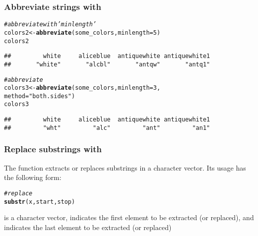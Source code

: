 \documentclass[12pt]{beamer}\usepackage[]{graphicx}\usepackage[]{color}
\makeatletter
\newcommand{\hlnum}[1]{\textcolor[rgb]{0.686,0.059,0.569}{#1}}%
\newcommand{\hlstr}[1]{\textcolor[rgb]{0.192,0.494,0.8}{#1}}%
\newcommand{\hlcom}[1]{\textcolor[rgb]{0.678,0.584,0.686}{\textit{#1}}}%
\newcommand{\hlstd}[1]{\textcolor[rgb]{0.345,0.345,0.345}{#1}}%
\newcommand{\hlkwb}[1]{\textcolor[rgb]{0.69,0.353,0.396}{#1}}%
\newcommand{\hlkwc}[1]{\textcolor[rgb]{0.333,0.667,0.333}{#1}}%
\newcommand{\hlkwd}[1]{\textcolor[rgb]{0.737,0.353,0.396}{\textbf{#1}}}%
\newenvironment{kframe}{%
 \def\at@end@of@kframe{}%
 \ifinner\ifhmode%
  \def\at@end@of@kframe{\end{minipage}}%
  \begin{minipage}{\columnwidth}%
 \fi\fi%
 \def\FrameCommand##1{\hskip\@totalleftmargin \hskip-\fboxsep
 \colorbox{shadecolor}{##1}\hskip-\fboxsep
     \hskip-\linewidth \hskip-\@totalleftmargin \hskip\columnwidth}%
 \MakeFramed {\advance\hsize-\width
   \@totalleftmargin\z@ \linewidth\hsize
   \@setminipage}}%
 {\par\unskip\endMakeFramed%
 \at@end@of@kframe}
\newenvironment{knitrout}{}{} %
\makeatother
\begin{document}
\begin{frame}[fragile]
\frametitle{Abbreviate strings with }

\begin{knitrout}\footnotesize
{}\color{fgcolor}\begin{kframe}
\begin{alltt}
\hlcom{# abbreviate with 'minlength'}
\hlstd{colors2} \hlkwb{<-} \hlkwd{abbreviate}\hlstd{(some_colors,} \hlkwc{minlength} \hlstd{=} \hlnum{5}\hlstd{)}
\hlstd{colors2}
\end{alltt}
\begin{verbatim}
##         white     aliceblue  antiquewhite antiquewhite1 
##       "white"       "alcbl"       "antqw"       "antq1"
\end{verbatim}
\begin{alltt}
\hlcom{# abbreviate}
\hlstd{colors3} \hlkwb{<-} \hlkwd{abbreviate}\hlstd{(some_colors,} \hlkwc{minlength} \hlstd{=} \hlnum{3}\hlstd{,}
                      \hlkwc{method} \hlstd{=} \hlstr{"both.sides"}\hlstd{)}
\hlstd{colors3}
\end{alltt}
\begin{verbatim}
##         white     aliceblue  antiquewhite antiquewhite1 
##         "wht"         "alc"         "ant"         "an1"
\end{verbatim}
\end{kframe}
\end{knitrout}

\end{frame}


\begin{frame}[fragile]
\frametitle{Replace substrings with }

The function  extracts or replaces substrings in a character vector. Its usage has the following form:
\begin{knitrout}\footnotesize
{}\color{fgcolor}\begin{kframe}
\begin{alltt}
\hlcom{# replace}
\hlkwd{substr}\hlstd{(x, start, stop)}
\end{alltt}
\end{kframe}
\end{knitrout}

 is a character vector,  indicates the first element to be extracted (or replaced), and  indicates the last element to be extracted (or replaced)

\end{frame}
\end{document}
